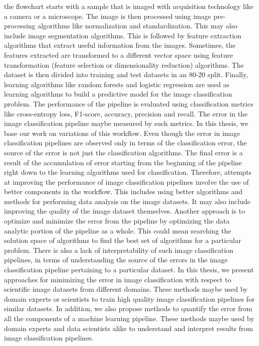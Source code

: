 the flowchart starts with a sample that is imaged with acquisition technology like a camera or a microscope. The image is then processed using image pre-processing algorithms like normalization and standardization. This may also include image segmentation algorithms. This is followed by feature extraction algorithms that extract useful information from the images. Sometimes, the features extracted are transformed to a different vector space using feature transformation (feature selection or dimensionality reduction) algorithms. The dataset is then divided into training and test datasets in an 80-20 split. Finally, learning algorithms like random forests and logistic regression are used as learning algorithms to build a predictive model for the image classification problem. The performance of the pipeline is evaluated using classification metrics like cross-entropy loss, F1-score, accuracy, precision and recall.  The error in the image classification pipeline maybe measured by such metrics. In this thesis, we base our work on variations of this workflow. Even though the error in image classification pipelines are observed only in terms of the classification error, the source of the error is not just the classification algorithms. The final error is a result of the accumulation of error starting from the beginning of the pipeline right down to the learning algorithms used for classification. Therefore, attempts at improving the performance of image classification pipelines involve the use of  better components in the workflow. This includes using better algorithms and methods for performing data analysis on the image datasets. It may also include improving the quality of the image dataset themselves. Another approach  is to optimize and minimize the error from the pipeline by optimizing the data analytic portion of the pipeline as a whole. This could mean searching the solution space of algorithms to find the best set of algorithms for a particular problem. 
There is also a lack of interpretability of such image classification pipelines, in terms of understanding the source of the errors in the image classification pipeline pertaining to a particular dataset. 
 In this thesis, we present approaches for minimizing the error in image classification with respect to scientific image datasets from different domains. These methods maybe used by domain experts or scientists to train high quality image classification pipelines for similar datasets.  In addition, we also propose methods to quantify the error from all the components of a machine learning pipeline. These methods maybe used by domain experts and data scientists alike to understand and interpret results from image classification pipelines.  

